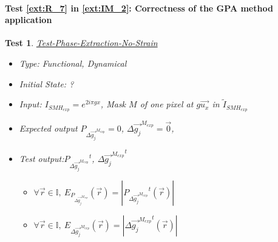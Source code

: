 \documentclass[12pt, titlepage]{article}
\newtheorem{Test}{Test}
\begin{document}
\paragraph{Test \cref{ext:R_7} in \cref{ext:IM_2}: Correctness of the GPA method application} 

\begin{Test}\normalfont\underline{Test-Phase-Extraction-No-Strain}
\label{T_Phase-Extraction-No-Strain}
\begin{itemize}
\item Type: Functional, Dynamical
\item Initial State: ?
\item Input: $I_{SMH_{exp}}=e^{2i\pi gx}$, Mask $M$ of one pixel at $g\overrightarrow{u_x}$ in $\widetilde{I}_{SMH_{exp}}$
\item Expected output $P_{\Delta \overrightarrow{g_{j}}^{M_{exp}}}=0$, $\Delta \overrightarrow{g_{j}}^{M_{exp}}=\overrightarrow{0}$, 
\item Test output:${P_{\Delta \overrightarrow{g_{j}}^{M_{exp}}}}^{t}$, $\Delta {\overrightarrow{g_{j}}^{M_{exp}}}^{t}$
	\begin{itemize}
	\item $\forall \vec{r} \in \mathbb{I}, \ E_{P_{\Delta \overrightarrow{g_{j}}^{M_{exp}}}}(\vec{r})=|{P_{\Delta \overrightarrow{g_{j}}^{M_{exp}}}}^{t}(\vec{r})|$
	\item $\forall \vec{r} \in \mathbb{I}, \ E_{\Delta {\overrightarrow{g_{j}}^{M_{exp}}}}(\vec{r})=|{\Delta {\overrightarrow{g_{j}}^{M_{exp}}}}^t(\vec{r})|$
	\end{itemize}  
\end{itemize}
\end{Test}
\end{document}
